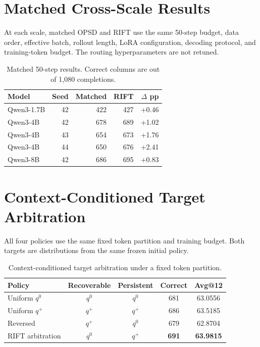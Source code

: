 \documentclass[10pt,letterpaper]{article}
\newcommand{\RIFT}{\textsc{RIFT}}
\newcommand{\best}[1]{\textbf{#1}}
\begin{document}
\section{Matched Cross-Scale Results}

At each scale, matched OPSD and \RIFT{} use the same 50-step budget, data order,
effective batch, rollout length, LoRA configuration, decoding protocol, and
training-token budget. The routing hyperparameters are not retuned.

\begin{table}[H]
\centering
\small
\begin{tabular}{lrrrr}
\toprule
Model & Seed & Matched & \RIFT{} & $\Delta$ pp \\
\midrule
Qwen3-1.7B & 42 & 422 & 427 & +0.46 \\
Qwen3-4B & 42 & 678 & 689 & +1.02 \\
Qwen3-4B & 43 & 654 & 673 & +1.76 \\
Qwen3-4B & 44 & 650 & 676 & +2.41 \\
Qwen3-8B & 42 & 686 & 695 & +0.83 \\
\bottomrule
\end{tabular}
\caption{Matched 50-step results. Correct columns are out of 1,080 completions.}
\label{tab:supp-crossscale}
\end{table}

\section{Context-Conditioned Target Arbitration}

All four policies use the same fixed token partition and training budget. Both
targets are distributions from the same frozen initial policy.

\begin{table}[H]
\centering
\small
\setlength{\tabcolsep}{5pt}
\begin{tabular}{lcccc}
\toprule
Policy & Recoverable & Persistent & Correct & Avg@12 \\
\midrule
Uniform $q^0$ & $q^0$ & $q^0$ & 681 & 63.0556 \\
Uniform $q^+$ & $q^+$ & $q^+$ & 686 & 63.5185 \\
Reversed & $q^+$ & $q^0$ & 679 & 62.8704 \\
\RIFT{} arbitration & $q^0$ & $q^+$ & \best{691} & \best{63.9815} \\
\bottomrule
\end{tabular}
\caption{Context-conditioned target arbitration under a fixed token partition.}
\label{tab:supp-source}
\end{table}
\end{document}
